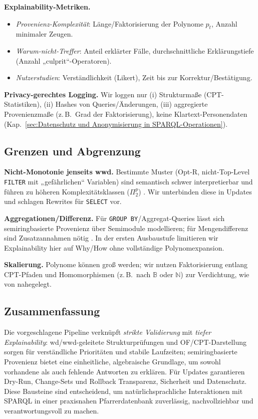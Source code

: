 \textbf{Explainability-Metriken.}
\begin{itemize}
  \item \emph{Provenienz-Komplexität}: Länge/Faktorisierung der Polynome \(p_t\), Anzahl minimaler Zeugen.
  \item \emph{Warum-nicht-Treffer}: Anteil erklärter Fälle, durchschnittliche Erklärungstiefe (Anzahl „culprit“-Operatoren).
  \item \emph{Nutzerstudien}: Verständlichkeit (Likert), Zeit bis zur Korrektur/Bestätigung.
\end{itemize}

\textbf{Privacy-gerechtes Logging.} Wir loggen nur (i) Strukturmaße (CPT-Statistiken), (ii) Hashes von Queries/Änderungen, (iii) aggregierte Provenienzmaße (z.\,B.\ Grad der Faktorisierung), keine Klartext-Personendaten (Kap.~\ref{sec:Datenschutz und Anonymisierung in SPARQL-Operationen}).


\subsection{Grenzen und Abgrenzung}
\label{sec:valid-grenzen}

\textbf{Nicht-Monotonie jenseits wwd.} Bestimmte Muster (Opt-R, nicht-Top-Level \texttt{FILTER} mit „gefährlichen“ Variablen) sind semantisch schwer interpretierbar und führen zu höheren Komplexitätsklassen (\(\Pi_2^p\)) \cite{kaminski2016beyond}. Wir unterbinden diese in Updates und schlagen Rewrites für \texttt{SELECT} vor.

\textbf{Aggregationen/Differenz.} Für \texttt{GROUP BY}/Aggregat-Queries lässt sich semiringbasierte Provenienz über Semimodule modellieren; für Mengendifferenz sind Zusatzannahmen nötig \cite{green2007provenance}. In der ersten Ausbaustufe limitieren wir Explainability hier auf Why/How ohne vollständige Polynomexpansion.

\textbf{Skalierung.} Polynome können groß werden; wir nutzen Faktorisierung entlang CPT-Pfaden und Homomorphismen (z.\,B.\ nach \(\mathbb{B}\) oder \(\mathbb{N}\)) zur Verdichtung, wie von \cite{green2007provenance} nahegelegt.


\subsection{Zusammenfassung}
\label{sec:valid-zusammenfassung}

Die vorgeschlagene Pipeline verknüpft \emph{strikte Validierung} mit \emph{tiefer Explainability}: wd/wwd-geleitete Strukturprüfungen und OF/CPT-Darstellung sorgen für verständliche Prioritäten und stabile Laufzeiten; semiringbasierte Provenienz bietet eine einheitliche, algebraische Grundlage, um sowohl vorhandene als auch fehlende Antworten zu erklären. Für Updates garantieren Dry-Run, Change-Sets und Rollback Transparenz, Sicherheit und Datenschutz. Diese Bausteine sind entscheidend, um natürlichsprachliche Interaktionen mit SPARQL in einer praxisnahen Pfarrerdatenbank zuverlässig, nachvollziehbar und verantwortungsvoll zu machen.




